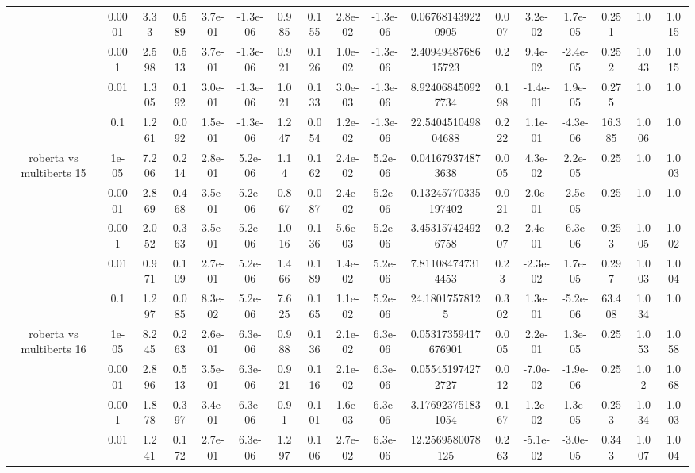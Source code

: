 \begin{tabular}{|c|c|c|c|c|c|c|c|c|c|c|c|c|c|c|c|c|}
 & 0.0001 & 3.33 & 0.589 & 3.7e-01 & -1.3e-06 & 0.985 & 0.155 & 2.8e-02 & -1.3e-06 & 0.067681439220905 & 0.007 & 3.2e-02 & 1.7e-05 & 0.251 & 1.0 & 1.015 \\
 & 0.001 & 2.598 & 0.513 & 3.7e-01 & -1.3e-06 & 0.921 & 0.126 & 1.0e-02 & -1.3e-06 & 2.4094948768615723 & 0.2 & 9.4e-02 & -2.4e-05 & 0.252 & 1.043 & 1.015 \\
 & 0.01 & 1.305 & 0.192 & 3.0e-01 & -1.3e-06 & 1.021 & 0.133 & 3.0e-03 & -1.3e-06 & 8.924068450927734 & 0.198 & -1.4e-01 & 1.9e-05 & 0.275 & 1.0 & 1.0 \\
 & 0.1 & 1.261 & 0.092 & 1.5e-01 & -1.3e-06 & 1.247 & 0.054 & 1.2e-02 & -1.3e-06 & 22.540451049804688 & 0.222 & 1.1e-01 & -4.3e-06 & 16.385 & 1.006 & 1.0 \\
\hline
\multirow{5}{*}{roberta  vs multiberts 15} & 1e-05 & 7.206 & 0.214 & 2.8e-01 & 5.2e-06 & 1.14 & 0.162 & 2.4e-02 & 5.2e-06 & 0.041679374873638 & 0.005 & 4.3e-02 & 2.2e-05 & 0.25 & 1.0 & 1.003 \\
 & 0.0001 & 2.869 & 0.468 & 3.5e-01 & 5.2e-06 & 0.867 & 0.087 & 2.4e-02 & 5.2e-06 & 0.13245770335197402 & 0.021 & 2.0e-01 & -2.5e-05 & 0.25 & 1.0 & 1.0 \\
 & 0.001 & 2.052 & 0.363 & 3.5e-01 & 5.2e-06 & 1.016 & 0.136 & 5.6e-03 & 5.2e-06 & 3.453157424926758 & 0.207 & 2.4e-01 & -6.3e-06 & 0.253 & 1.005 & 1.002 \\
 & 0.01 & 0.971 & 0.109 & 2.7e-01 & 5.2e-06 & 1.466 & 0.189 & 1.4e-02 & 5.2e-06 & 7.811084747314453 & 0.23 & -2.3e-02 & 1.7e-05 & 0.297 & 1.003 & 1.004 \\
 & 0.1 & 1.297 & 0.085 & 8.3e-02 & 5.2e-06 & 7.625 & 0.165 & 1.1e-02 & 5.2e-06 & 24.18017578125 & 0.302 & 1.3e-01 & -5.2e-06 & 63.408 & 1.034 & 1.0 \\
\hline
\multirow{5}{*}{roberta  vs multiberts 16} & 1e-05 & 8.245 & 0.263 & 2.6e-01 & 6.3e-06 & 0.988 & 0.136 & 2.1e-02 & 6.3e-06 & 0.05317359417676901 & 0.005 & 2.2e-01 & 1.3e-05 & 0.25 & 1.053 & 1.058 \\
 & 0.0001 & 2.896 & 0.513 & 3.5e-01 & 6.3e-06 & 0.921 & 0.116 & 2.1e-02 & 6.3e-06 & 0.055451974272727 & 0.012 & -7.0e-02 & -1.9e-06 & 0.25 & 1.02 & 1.068 \\
 & 0.001 & 1.878 & 0.397 & 3.4e-01 & 6.3e-06 & 0.91 & 0.101 & 1.6e-03 & 6.3e-06 & 3.176923751831054 & 0.167 & 1.2e-02 & 1.3e-05 & 0.253 & 1.034 & 1.003 \\
 & 0.01 & 1.241 & 0.172 & 2.7e-01 & 6.3e-06 & 1.297 & 0.106 & 2.7e-02 & 6.3e-06 & 12.2569580078125 & 0.263 & -5.1e-02 & -3.0e-05 & 0.343 & 1.007 & 1.004 \\

\end{tabular}
